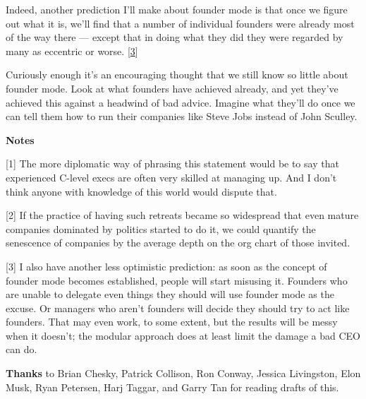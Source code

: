 Indeed, another prediction I'll make about founder mode is that once we
figure out what it is, we'll find that a number of individual founders
were already most of the way there --- except that in doing what they
did they were regarded by many as eccentric or worse.
{[}\hyperref[f3n]{3}{]}

Curiously enough it's an encouraging thought that we still know so
little about founder mode. Look at what founders have achieved already,
and yet they've achieved this against a headwind of bad advice. Imagine
what they'll do once we can tell them how to run their companies like
Steve Jobs instead of John Sculley.

\textbf{Notes}

{[}1{]} The more diplomatic way of phrasing this statement would be to
say that experienced C-level execs are often very skilled at managing
up. And I don't think anyone with knowledge of this world would dispute
that.

{[}2{]} If the practice of having such retreats became so widespread
that even mature companies dominated by politics started to do it, we
could quantify the senescence of companies by the average depth on the
org chart of those invited.

{[}3{]} I also have another less optimistic prediction: as soon as the
concept of founder mode becomes established, people will start misusing
it. Founders who are unable to delegate even things they should will use
founder mode as the excuse. Or managers who aren't founders will decide
they should try to act like founders. That may even work, to some
extent, but the results will be messy when it doesn't; the modular
approach does at least limit the damage a bad CEO can do.

\textbf{Thanks} to Brian Chesky, Patrick Collison, Ron Conway, Jessica
Livingston, Elon Musk, Ryan Petersen, Harj Taggar, and Garry Tan for
reading drafts of this.
